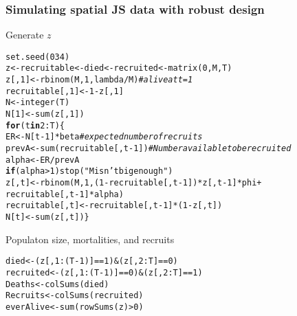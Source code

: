 \documentclass[color=usenames,dvipsnames]{beamer}\usepackage[]{graphicx}\usepackage[]{xcolor}
\makeatletter
\newcommand{\hlnum}[1]{\textcolor[rgb]{0.69,0.494,0}{#1}}%
\newcommand{\hlsng}[1]{\textcolor[rgb]{0.749,0.012,0.012}{#1}}%
\newcommand{\hlcom}[1]{\textcolor[rgb]{0.514,0.506,0.514}{\textit{#1}}}%
\newcommand{\hlopt}[1]{\textcolor[rgb]{0,0,0}{#1}}%
\newcommand{\hldef}[1]{\textcolor[rgb]{0,0,0}{#1}}%
\newcommand{\hlkwa}[1]{\textcolor[rgb]{0,0,0}{\textbf{#1}}}%
\newcommand{\hlkwb}[1]{\textcolor[rgb]{0,0.341,0.682}{#1}}%
\newcommand{\hlkwd}[1]{\textcolor[rgb]{0.004,0.004,0.506}{#1}}%
\newenvironment{kframe}{%
 \def\at@end@of@kframe{}%
 \ifinner\ifhmode%
  \def\at@end@of@kframe{\end{minipage}}%
  \begin{minipage}{\columnwidth}%
 \fi\fi%
 \def\FrameCommand##1{\hskip\@totalleftmargin \hskip-\fboxsep
 \colorbox{shadecolor}{##1}\hskip-\fboxsep
     \hskip-\linewidth \hskip-\@totalleftmargin \hskip\columnwidth}%
 \MakeFramed {\advance\hsize-\width
   \@totalleftmargin\z@ \linewidth\hsize
   \@setminipage}}%
 {\par\unskip\endMakeFramed%
 \at@end@of@kframe}
\newenvironment{knitrout}{}{} %
\makeatother
\begin{document}
\begin{frame}[fragile]
  \frametitle{Simulating spatial JS data with robust design}
{Generate $z$}
\begin{knitrout}\scriptsize
{}\color{fgcolor}\begin{kframe}
\begin{alltt}
\hlkwd{set.seed}\hldef{(}\hlnum{034}\hldef{)}
\hldef{z} \hlkwb{<-} \hldef{recruitable} \hlkwb{<-} \hldef{died} \hlkwb{<-} \hldef{recruited} \hlkwb{<-} \hlkwd{matrix}\hldef{(}\hlnum{0}\hldef{, M, T)}
\hldef{z[,}\hlnum{1}\hldef{]} \hlkwb{<-} \hlkwd{rbinom}\hldef{(M,} \hlnum{1}\hldef{, lambda}\hlopt{/}\hldef{M)} \hlcom{# alive at t=1}
\hldef{recruitable[,}\hlnum{1}\hldef{]} \hlkwb{<-} \hlnum{1}\hlopt{-}\hldef{z[,}\hlnum{1}\hldef{]}
\hldef{N} \hlkwb{<-} \hlkwd{integer}\hldef{(T)}
\hldef{N[}\hlnum{1}\hldef{]} \hlkwb{<-} \hlkwd{sum}\hldef{(z[,}\hlnum{1}\hldef{])}
\hlkwa{for}\hldef{(t} \hlkwa{in} \hlnum{2}\hlopt{:}\hldef{T) \{}
    \hldef{ER} \hlkwb{<-} \hldef{N[t}\hlopt{-}\hlnum{1}\hldef{]}\hlopt{*}\hldef{beta} \hlcom{# expected number of recruits}
    \hldef{prevA} \hlkwb{<-} \hlkwd{sum}\hldef{(recruitable[,t}\hlopt{-}\hlnum{1}\hldef{])} \hlcom{# Number available to be recruited}
    \hldef{alpha} \hlkwb{<-} \hldef{ER}\hlopt{/}\hldef{prevA}
    \hlkwa{if}\hldef{(alpha} \hlopt{>} \hlnum{1}\hldef{)} \hlkwd{stop}\hldef{(}\hlsng{"M isn't big enough"}\hldef{)}
    \hldef{z[,t]} \hlkwb{<-} \hlkwd{rbinom}\hldef{(M,} \hlnum{1}\hldef{, (}\hlnum{1}\hlopt{-}\hldef{recruitable[,t}\hlopt{-}\hlnum{1}\hldef{])}\hlopt{*}\hldef{z[,t}\hlopt{-}\hlnum{1}\hldef{]}\hlopt{*}\hldef{phi} \hlopt{+}
                          \hldef{recruitable[,t}\hlopt{-}\hlnum{1}\hldef{]}\hlopt{*}\hldef{alpha)}
    \hldef{recruitable[,t]} \hlkwb{<-} \hldef{recruitable[,t}\hlopt{-}\hlnum{1}\hldef{]}\hlopt{*}\hldef{(}\hlnum{1}\hlopt{-}\hldef{z[,t])}
    \hldef{N[t]} \hlkwb{<-} \hlkwd{sum}\hldef{(z[,t])  \}}
\end{alltt}
\end{kframe}
\end{knitrout}
\pause
\vfill
{\normalsize Populaton size, mortalities, and recruits}
\begin{knitrout}\scriptsize
{}\color{fgcolor}\begin{kframe}
\begin{alltt}
\hldef{died} \hlkwb{<-} \hldef{(z[,}\hlnum{1}\hlopt{:}\hldef{(T}\hlopt{-}\hlnum{1}\hldef{)]}\hlopt{==}\hlnum{1}\hldef{)} \hlopt{&} \hldef{(z[,}\hlnum{2}\hlopt{:}\hldef{T]}\hlopt{==}\hlnum{0}\hldef{)}
\hldef{recruited} \hlkwb{<-} \hldef{(z[,}\hlnum{1}\hlopt{:}\hldef{(T}\hlopt{-}\hlnum{1}\hldef{)]}\hlopt{==}\hlnum{0}\hldef{)} \hlopt{&} \hldef{(z[,}\hlnum{2}\hlopt{:}\hldef{T]}\hlopt{==}\hlnum{1}\hldef{)}
\hldef{Deaths} \hlkwb{<-} \hlkwd{colSums}\hldef{(died)}
\hldef{Recruits} \hlkwb{<-} \hlkwd{colSums}\hldef{(recruited)}
\hldef{everAlive} \hlkwb{<-} \hlkwd{sum}\hldef{(}\hlkwd{rowSums}\hldef{(z)}\hlopt{>}\hlnum{0}\hldef{)}
\end{alltt}
\end{kframe}
\end{knitrout}
\end{frame}
\end{document}
